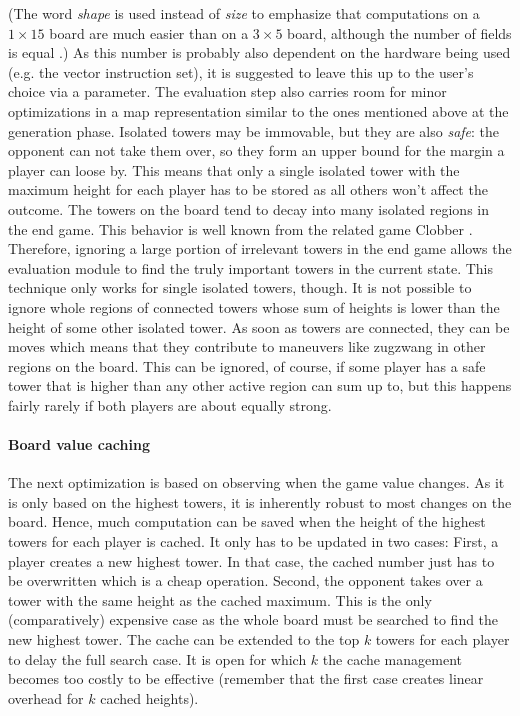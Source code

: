 \documentclass[sigconf]{acmart}
\begin{document}
(The word \emph{shape} is used instead of \emph{size} to emphasize that computations on a $1\times15$ board are much easier than on a $3\times5$ board, although the number of fields is equal \cite{Althöfer2020}.)
As this number is probably also dependent on the hardware being used (e.g. the vector instruction set), it is suggested to leave this up to the user's choice via a parameter.
The evaluation step also carries room for minor optimizations in a map representation similar to the ones mentioned above at the generation phase.
Isolated towers may be immovable, but they are also \emph{safe}:
the opponent can not take them over, so they form an upper bound for the margin a player can loose by.
This means that only a single isolated tower with the maximum height for each player has to be stored as all others won't affect the outcome.
The towers on the board tend to decay into many isolated regions in the end game.
This behavior is well known from the related game Clobber \cite{Althöfer2004}.
Therefore, ignoring a large portion of irrelevant towers in the end game allows the evaluation module to find the truly important towers in the current state.
This technique only works for single isolated towers, though.
It is not possible to ignore whole regions of connected towers whose sum of heights is lower than the height of some other isolated tower.
As soon as towers are connected, they can be moves which means that they contribute to maneuvers like zugzwang in other regions on the board.
This can be ignored, of course, if some player has a safe tower that is higher than any other active region can sum up to, but this happens fairly rarely if both players are about equally strong.

\paragraph{Board value caching}
The next optimization is based on observing when the game value changes.
As it is only based on the highest towers, it is inherently robust to most changes on the board.
Hence, much computation can be saved when the height of the highest towers for each player is cached.
It only has to be updated in two cases:
First, a player creates a new highest tower.
In that case, the cached number just has to be overwritten which is a cheap operation.
Second, the opponent takes over a tower with the same height as the cached maximum.
This is the only (comparatively) expensive case as the whole board must be searched to find the new highest tower.
The cache can be extended to the top $k$ towers for each player to delay the full search case.
It is open for which $k$ the cache management becomes too costly to be effective (remember that the first case creates linear overhead for $k$ cached heights).
\end{document}
